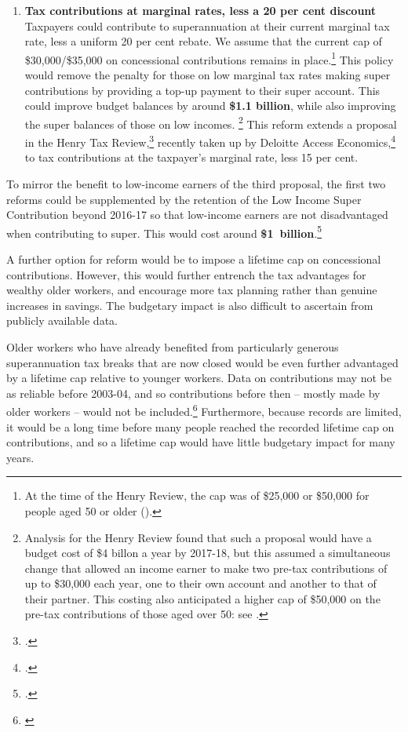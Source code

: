 \begin{enumerate}
\item 
{\textbf{Tax contributions at marginal rates, less a 20 per cent discount}}\\
Taxpayers could contribute to superannuation at their current marginal tax rate, less a uniform 20 per cent rebate. We assume that the current cap of \$30,000/\$35,000 on concessional contributions remains in place.\footnote{At the time of the Henry Review, the cap was of \$25,000 or \$50,000 for people aged 50 or older (\textcite[][100]{HenryTaxReview2010}).}  This policy would remove the penalty for those on low marginal tax rates making super contributions by providing a top-up payment to their super account. This could improve budget balances by around \textbf{\$1.1 billion}, while also improving the super balances of those on low incomes.%
\footnote{Analysis for the Henry Review found that such a proposal would have a budget cost of \$4 billon a year by 2017-18, but this assumed a simultaneous change that allowed an income earner to make two pre-tax contributions of up to \$30,000 each year, one to their own account and another to that of their partner. This costing also anticipated a higher cap of \$50,000 on the pre-tax contributions of those aged over 50: see \textcites{Treasury2010SuperAdditionalMaterial}[][95]{HenryTaxReview2010}.}  
This reform extends a proposal in the Henry Tax Review,\footcite[][102]{Treasury2010IGR}  recently taken up by Deloitte Access Economics,\footcite{Deloitte2015TaxReformSheddingLight}  to tax contributions at the taxpayer’s marginal rate, less 15 per cent.
\end{enumerate}

To mirror the benefit to low-income earners of the third proposal, the first two reforms could be supplemented by the retention of the Low Income Super Contribution beyond 2016-17 so that low-income earners are not disadvantaged when contributing to super. This would cost around \textbf{\$1~billion}.\footcite[][Table~2.16, p.~206]{Treasury2013PortfolioBudgetStatement1314}

A further option for reform would be to impose a lifetime cap on concessional contributions. However, this would further entrench the tax advantages for wealthy older workers, and encourage more tax planning rather than genuine increases in savings. The budgetary impact is also difficult to ascertain from publicly available data. 

Older workers who have already benefited from particularly generous superannuation tax breaks that are now closed would be even further advantaged by a lifetime cap relative to younger workers. Data on contributions may not be as reliable before 2003-04, and so contributions before then – mostly made by older workers – would not be included.\footnote{\textcites{SuperContrTaxRegs1997}{ATO2003}{ATO2008}{ATO2014g}{ATO2014h}} Furthermore, because records are limited, it would be a long time before many people reached the recorded lifetime cap on contributions, and so a lifetime cap would have little budgetary impact for many years.

